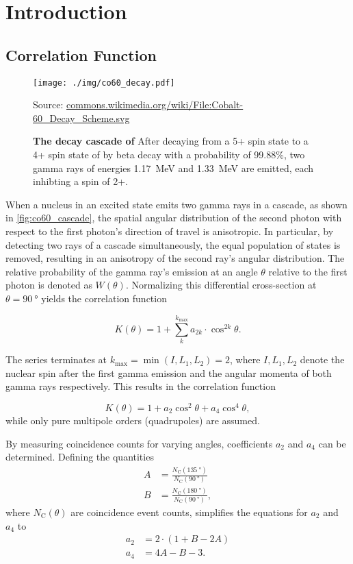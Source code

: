 \chapter{Introduction}

\section{Correlation Function}
\begin{figure}[tbp]
	\centering
	\texttt{[image: ./img/co60\_decay.pdf]}
	\caption*{Source: \url{commons.wikimedia.org/wiki/File:Cobalt-60_Decay_Scheme.svg}}
	\caption[The decay cascade of ]{\textbf{The decay cascade of } After decaying from a 5+ spin state to a 4+ spin state of  by beta decay with a probability of \num{99.88}\%, two gamma rays of energies \SI{1.17}{\MeV} and \SI{1.33}{\MeV} are emitted, each inhibting a spin of 2+.}
	\label{fig:co60_cascade}
\end{figure}
When a nucleus in an excited state emits two gamma rays in a cascade, as shown in \autoref{fig:co60_cascade}, the spatial angular distribution of the second photon with respect to the first photon's direction of travel is anisotropic.
In particular, by detecting two rays of a cascade simultaneously, the equal population of states is removed, resulting in an anisotropy of the second ray's angular distribution.
The relative probability of the gamma ray's emission at an angle $\theta$ relative to the first photon is denoted as $W(\theta)$.
Normalizing this differential cross-section at $\theta=\SI{90}{\degree}$ yields the correlation function

\begin{equation*}
	K(\theta) = 1 + \sum_{k}^{k_\text{max}}a_{2k}\cdot\cos^{2k}{\theta}.
\end{equation*}

The series terminates at $k_\text{max}=\min(I, L_1, L_2)=2$, where $I, L_1, L_2$ denote the nuclear spin after the first gamma emission and the angular momenta of both gamma rays respectively.
This results in the correlation function

\begin{equation}\label{eq:corr_func}
	K(\theta) = 1 + a_2\cos^{2}{\theta} + a_4\cos^{4}{\theta},
\end{equation}
while only pure multipole orders (quadrupoles) are assumed.

By measuring coincidence counts for varying angles, coefficients $a_2$ and $a_4$ can be determined.
Defining the quantities
\begin{align}
	A&=\frac{N_\text{C}(\SI{135}{\degree})}{N_\text{C}(\SI{90}{\degree})} \label{eq:A}\\
	B&=\frac{N_\text{C}(\SI{180}{\degree})}{N_\text{C}(\SI{90}{\degree})}, \label{eq:B}
\end{align}
where $N_\text{C}(\theta)$ are coincidence event counts, simplifies the equations for $a_2$ and $a_4$ to
\begin{align}
	a_2 &= 2\cdot(1+B-2A) \label{eq:a2}\\
	a_4 &= 4A-B-3. \label{eq:a4}
\end{align}

